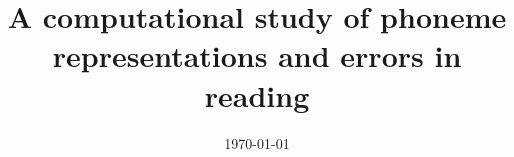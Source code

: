 \documentclass[a4paper, 12pt, oneside]{Thesis}  %
\begin{document}
\selectfont
\frontmatter      %

\title{A computational study of phoneme representations and errors in reading}
\addresses  {\groupname\\\deptname\\\univname}  %
\date       {\today}
\subject    {}
\keywords   {}

\maketitle


\fancyhead{}  %
\rhead{\thepage}  %
\lhead{}  %

\pagestyle{fancy}  %




 
 
\end{document}
